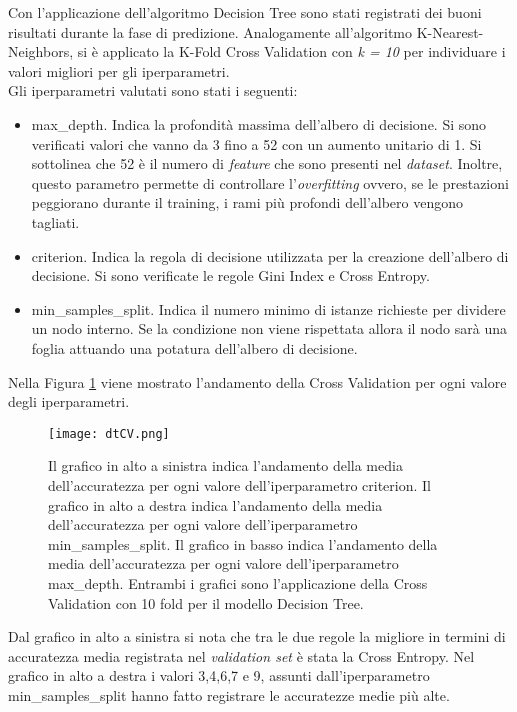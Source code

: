 Con l'applicazione dell'algoritmo Decision Tree sono stati registrati dei buoni risultati durante la fase di predizione. Analogamente all'algoritmo K-Nearest-Neighbors, si è applicato la K-Fold Cross Validation con \emph{k = 10} per individuare i valori migliori per gli iperparametri.\\
Gli iperparametri valutati sono stati i seguenti:
\begin{itemize}
	\item \textsf{max\_depth}. Indica la profondità massima dell'albero di decisione. Si sono verificati valori che vanno da 3 fino a 52 con un aumento unitario di 1. Si sottolinea che 52 è il numero di \emph{feature} che sono presenti nel \emph{dataset}. Inoltre, questo parametro permette di controllare l'\emph{overfitting} ovvero, se le prestazioni peggiorano durante il training, i rami più profondi dell'albero vengono tagliati.
	\item \textsf{criterion}. Indica la regola di decisione utilizzata per la creazione dell'albero di decisione. Si sono verificate le regole Gini Index e Cross Entropy.
	\item \textsf{min\_samples\_split}. Indica il numero minimo di istanze richieste per dividere un nodo interno. Se la condizione non viene rispettata allora il nodo sarà una foglia attuando una potatura dell'albero di decisione.
\end{itemize}
Nella Figura \ref{fig:dtCV}  viene mostrato l'andamento della Cross Validation per ogni valore degli iperparametri.
\begin{figure}[h]
	\begin{center}
		\texttt{[image: dtCV.png]}
		\caption{Il grafico in alto a sinistra indica l'andamento della media dell'accuratezza per ogni valore dell'iperparametro \textsf{criterion}. Il grafico in alto a destra indica l'andamento della media dell'accuratezza per ogni valore dell'iperparametro \textsf{min\_samples\_split}. Il grafico in basso indica l'andamento della media dell'accuratezza per ogni valore dell'iperparametro \textsf{max\_depth}. Entrambi i grafici sono l'applicazione della Cross Validation con 10 fold per il modello Decision Tree. 
		} 
		\label{fig:dtCV}
	\end{center}
\end{figure}
Dal grafico in alto a sinistra si nota che tra le due regole la migliore in termini di accuratezza media registrata nel \emph{validation set} è stata la Cross Entropy. Nel grafico in alto a destra i valori 3,4,6,7 e 9, assunti dall'iperparametro \textsf{min\_samples\_split} hanno fatto registrare le accuratezze medie più alte.\\
